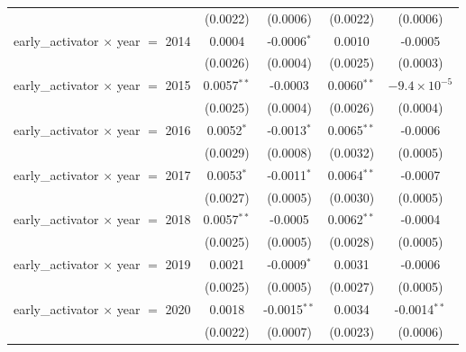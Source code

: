 \begin{tabular}{lcccc}
                                                    & (0.0022)           & (0.0006)                  & (0.0022)             & (0.0006)\\   
   early\_activator $\times$ year $=$ 2014          & 0.0004             & -0.0006$^{*}$             & 0.0010               & -0.0005\\   
                                                    & (0.0026)           & (0.0004)                  & (0.0025)             & (0.0003)\\   
   early\_activator $\times$ year $=$ 2015          & 0.0057$^{**}$      & -0.0003                   & 0.0060$^{**}$        & $-9.4\times 10^{-5}$\\    
                                                    & (0.0025)           & (0.0004)                  & (0.0026)             & (0.0004)\\   
   early\_activator $\times$ year $=$ 2016          & 0.0052$^{*}$       & -0.0013$^{*}$             & 0.0065$^{**}$        & -0.0006\\   
                                                    & (0.0029)           & (0.0008)                  & (0.0032)             & (0.0005)\\   
   early\_activator $\times$ year $=$ 2017          & 0.0053$^{*}$       & -0.0011$^{*}$             & 0.0064$^{**}$        & -0.0007\\   
                                                    & (0.0027)           & (0.0005)                  & (0.0030)             & (0.0005)\\   
   early\_activator $\times$ year $=$ 2018          & 0.0057$^{**}$      & -0.0005                   & 0.0062$^{**}$        & -0.0004\\   
                                                    & (0.0025)           & (0.0005)                  & (0.0028)             & (0.0005)\\   
   early\_activator $\times$ year $=$ 2019          & 0.0021             & -0.0009$^{*}$             & 0.0031               & -0.0006\\   
                                                    & (0.0025)           & (0.0005)                  & (0.0027)             & (0.0005)\\   
   early\_activator $\times$ year $=$ 2020          & 0.0018             & -0.0015$^{**}$            & 0.0034               & -0.0014$^{**}$\\   
                                                    & (0.0022)           & (0.0007)                  & (0.0023)             & (0.0006)\\   

\end{tabular}
